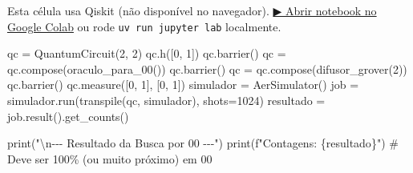 \documentclass[
  brazilian,
]{report}
\newenvironment{Shaded}{\begin{snugshade}}{\end{snugshade}}
\newcommand{\BuiltInTok}[1]{\textcolor[rgb]{0.00,0.23,0.31}{#1}}
\newcommand{\CharTok}[1]{\textcolor[rgb]{0.13,0.47,0.30}{#1}}
\newcommand{\CommentTok}[1]{\textcolor[rgb]{0.37,0.37,0.37}{#1}}
\newcommand{\DecValTok}[1]{\textcolor[rgb]{0.68,0.00,0.00}{#1}}
\newcommand{\NormalTok}[1]{\textcolor[rgb]{0.00,0.23,0.31}{#1}}
\newcommand{\OperatorTok}[1]{\textcolor[rgb]{0.37,0.37,0.37}{#1}}
\newcommand{\SpecialCharTok}[1]{\textcolor[rgb]{0.37,0.37,0.37}{#1}}
\newcommand{\SpecialStringTok}[1]{\textcolor[rgb]{0.13,0.47,0.30}{#1}}
\newcommand{\StringTok}[1]{\textcolor[rgb]{0.13,0.47,0.30}{#1}}
\begin{document}
\begin{tcolorbox}[enhanced jigsaw, arc=.35mm, bottomrule=.15mm, bottomtitle=1mm, breakable, colback=white, colbacktitle=quarto-callout-warning-color!10!white, colframe=quarto-callout-warning-color-frame, coltitle=black, left=2mm, leftrule=.75mm, opacityback=0, opacitybacktitle=0.6, rightrule=.15mm, title=\textcolor{quarto-callout-warning-color}{\faExclamationTriangle}\hspace{0.5em}{⚛️ Célula Qiskit --- execute no Colab ou localmente}, titlerule=0mm, toprule=.15mm, toptitle=1mm]

Esta célula usa Qiskit (não disponível no navegador).
\href{https://colab.research.google.com/github/maxwellamaral/aula-quantum/blob/main/notebooks/06-grover.ipynb}{▶
Abrir notebook no Google Colab} ou rode \texttt{uv\ run\ jupyter\ lab}
localmente.

\begin{Shaded}
\begin{Highlighting}[]

\NormalTok{qc }\OperatorTok{=}\NormalTok{ QuantumCircuit(}\DecValTok{2}\NormalTok{, }\DecValTok{2}\NormalTok{)}
\NormalTok{qc.h([}\DecValTok{0}\NormalTok{, }\DecValTok{1}\NormalTok{])}
\NormalTok{qc.barrier()}
\NormalTok{qc }\OperatorTok{=}\NormalTok{ qc.compose(oraculo\_para\_00())}
\NormalTok{qc.barrier()}
\NormalTok{qc }\OperatorTok{=}\NormalTok{ qc.compose(difusor\_grover(}\DecValTok{2}\NormalTok{))}
\NormalTok{qc.barrier()}
\NormalTok{qc.measure([}\DecValTok{0}\NormalTok{, }\DecValTok{1}\NormalTok{], [}\DecValTok{0}\NormalTok{, }\DecValTok{1}\NormalTok{])}
\NormalTok{simulador }\OperatorTok{=}\NormalTok{ AerSimulator()}
\NormalTok{job }\OperatorTok{=}\NormalTok{ simulador.run(transpile(qc, simulador), shots}\OperatorTok{=}\DecValTok{1024}\NormalTok{)   }
\NormalTok{resultado }\OperatorTok{=}\NormalTok{ job.result().get\_counts()}

\BuiltInTok{print}\NormalTok{(}\StringTok{"}\CharTok{\textbackslash{}n}\StringTok{{-}{-}{-} Resultado da Busca por \textquotesingle{}00\textquotesingle{} {-}{-}{-}"}\NormalTok{)}
\BuiltInTok{print}\NormalTok{(}\SpecialStringTok{f"Contagens: }\SpecialCharTok{\{}\NormalTok{resultado}\SpecialCharTok{\}}\SpecialStringTok{"}\NormalTok{)}
\CommentTok{\# Deve ser 100\% (ou muito próximo) em \textquotesingle{}00\textquotesingle{}}
\end{Highlighting}
\end{Shaded}

\end{tcolorbox}
\end{document}
